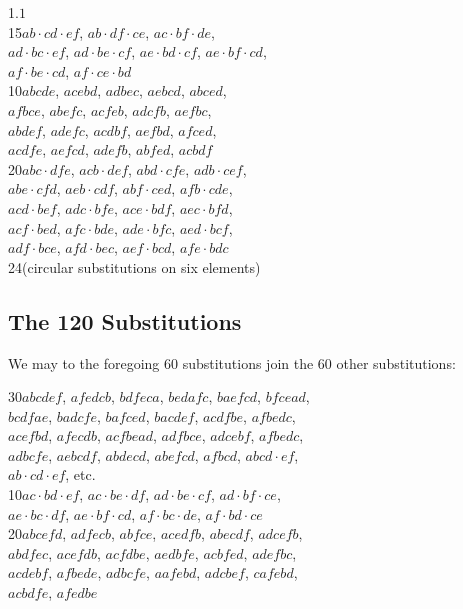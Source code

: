 \documentclass[11pt,a4paper]{article}
\theoremstyle{cayley}
\begin{document}
1.\quad $1$ \\
15\quad $ab \cdot cd \cdot ef$, $ab \cdot df \cdot ce$, $ac \cdot bf \cdot de$, \\
\phantom{15\quad} $ad \cdot bc \cdot ef$, $ad \cdot be \cdot cf$, $ae \cdot bd \cdot cf$, $ae \cdot bf \cdot cd$, \\
\phantom{15\quad} $af \cdot be \cdot cd$, $af \cdot ce \cdot bd$ \\
10\quad $abcde$, $acebd$, $adbec$, $aebcd$, $abced$, \\
\phantom{10\quad} $afbce$, $abefc$, $acfeb$, $adcfb$, $aefbc$, \\
\phantom{10\quad} $abdef$, $adefc$, $acdbf$, $aefbd$, $afced$, \\
\phantom{10\quad} $acdfe$, $aefcd$, $adefb$, $abfed$, $acbd f$ \\
20\quad $abc \cdot dfe$, $acb \cdot def$, $abd \cdot cfe$, $adb \cdot cef$, \\
\phantom{20\quad} $abe \cdot cfd$, $aeb \cdot cdf$, $abf \cdot ced$, $afb \cdot cde$, \\
\phantom{20\quad} $acd \cdot bef$, $adc \cdot bfe$, $ace \cdot bdf$, $aec \cdot bfd$, \\
\phantom{20\quad} $acf \cdot bed$, $afc \cdot bde$, $ade \cdot bfc$, $aed \cdot bcf$, \\
\phantom{20\quad} $adf \cdot bce$, $afd \cdot bec$, $aef \cdot bcd$, $afe \cdot bdc$ \\
24\quad (circular substitutions on six elements)

\subsection*{The 120 Substitutions}

We may to the foregoing 60 substitutions join the 60 other substitutions:

30\quad $abcdef$, $afedcb$, $bdfeca$, $bedafc$, $baefcd$, $bfcead$, \\
\phantom{30\quad} $bcdfae$, $badcfe$, $bafced$, $bacdef$, $acdfbe$, $afbedc$, \\
\phantom{30\quad} $acefbd$, $afecdb$, $acfbead$, $adfbce$, $adcebf$, $afbedc$, \\
\phantom{30\quad} $adbcfe$, $aebcdf$, $abdecd$, $abefcd$, $afbcd$, $abcd \cdot ef$, \\
\phantom{30\quad} $ab \cdot cd \cdot ef$, etc. \\
10\quad $ac \cdot bd \cdot ef$, $ac \cdot be \cdot df$, $ad \cdot be \cdot cf$, $ad \cdot bf \cdot ce$, \\
\phantom{10\quad} $ae \cdot bc \cdot df$, $ae \cdot bf \cdot cd$, $af \cdot bc \cdot de$, $af \cdot bd \cdot ce$ \\
20\quad $abcefd$, $adfecb$, $abfce$, $acedfb$, $abecdf$, $adcefb$, \\
\phantom{20\quad} $abdfec$, $acefdb$, $acfdbe$, $aedbfe$, $acbfed$, $adefbc$, \\
\phantom{20\quad} $acdebf$, $afbede$, $adbcfe$, $aafebd$, $adcbef$, $cafebd$, \\
\phantom{20\quad} $acbdfe$, $afedbe$ \\
\end{document}

